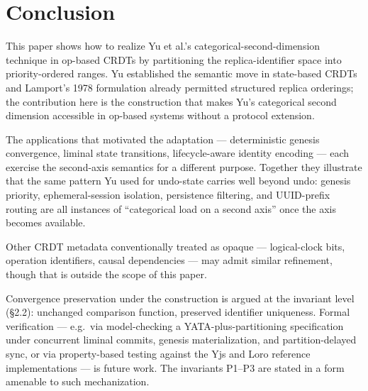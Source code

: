 \section{Conclusion}

This paper shows how to realize Yu et al.'s categorical-second-dimension technique in op-based CRDTs by partitioning the replica-identifier space into priority-ordered ranges. Yu established the semantic move in state-based CRDTs and Lamport's 1978 formulation already permitted structured replica orderings; the contribution here is the construction that makes Yu's categorical second dimension accessible in op-based systems without a protocol extension.

The applications that motivated the adaptation --- deterministic genesis convergence\cite{plexus:genesis}, liminal state transitions\cite{plexus:liminal}, lifecycle-aware identity encoding\cite{plexus:arch} --- each exercise the second-axis semantics for a different purpose. Together they illustrate that the same pattern Yu used for undo-state carries well beyond undo: genesis priority, ephemeral-session isolation, persistence filtering, and UUID-prefix routing are all instances of ``categorical load on a second axis'' once the axis becomes available.

Other CRDT metadata conventionally treated as opaque --- logical-clock bits, operation identifiers, causal dependencies --- may admit similar refinement, though that is outside the scope of this paper.

Convergence preservation under the construction is argued at the invariant level (§2.2): unchanged comparison function, preserved identifier uniqueness. Formal verification --- e.g.\ via model-checking a YATA-plus-partitioning specification under concurrent liminal commits, genesis materialization, and partition-delayed sync, or via property-based testing against the Yjs and Loro reference implementations --- is future work. The invariants P1--P3 are stated in a form amenable to such mechanization.






